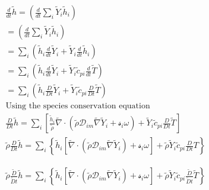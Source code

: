 \documentclass[preprint,12pt,authoryear]{elsarticle}
\begin{document}
\begin{equation}
\begin{split}
        \frac{d}{dt}\tilde{h}
        =
        \left(
                \frac{d}{dt}
		\sum\limits_i\tilde{Y}_i\tilde{h}_i
        \right)
\\
        =
        \left(
                \frac{d}{dt}
		\sum\limits_i\tilde{Y}_i
		\tilde{h}_i
        \right)
\\
        =
        \sum\limits_i
        \left(
                \tilde{h}_i
                \frac{d}{dt}
		\tilde{Y}_i
                +
                \tilde{Y}_i
                \frac{d}{dt}
		\tilde{h}_i
        \right)
\\
        =
        \sum\limits_i
        \left(
                \tilde{h}_i
                \frac{d}{dt}
		\tilde{Y}_i
                +
                \tilde{Y}_i
                \tilde{c}_{pi}
                \frac{d}{dt}
		\tilde{T}
        \right)
\\
        =
        \sum\limits_i
        \left(
                \tilde{h}_i
                \frac{D}{Dt}
		\tilde{Y}_i
                +
                \tilde{Y}_i
                \tilde{c}_{pi}
                \frac{D}{Dt}
		\tilde{T}
        \right)
\\
\text{Using the species conservation equation}
\\
        \frac{D}{Dt}
	\tilde{h}
        =
        \sum\limits_i
        \left[
                \frac{\tilde{h}_i}{\tilde{\rho}}
                \tilde{\nabla}\cdot
                (
		\tilde{\rho}\mathcal{D}_{im}\tilde{\nabla}\tilde{Y}_i
		+
        	\mathcal{s}_i \omega
		)
                +
                \tilde{Y}_i
                \tilde{c}_{pi}
        	\frac{D}{Dt}
		\tilde{T}
        \right]
\\
        \tilde{\rho}
        \frac{D}{Dt}
	\tilde{h}
        =
        \sum\limits_i
        \left\{
                \tilde{h}_i
                [
                	\tilde{\nabla}\cdot
			   (
			\tilde{\rho}\mathcal{D}_{im}\tilde{\nabla}\tilde{Y}_i
			)
			+
        		\mathcal{s}_i \omega
		    ]
                +
                \tilde{\rho}
                \tilde{Y}_i
                \tilde{c}_{pi}
        	\frac{D}{Dt}T
        \right\}
\end{split}
\end{equation}

\begin{equation}
\begin{split}
        \tilde{\rho}
        \frac{\tilde{D}}{\tilde{D} t}\tilde{h}
        =
        \sum\limits_i
        \left\{
                \tilde{h}_i
                [
                	\tilde{\nabla}\cdot
		     	(
			\tilde{\rho}\mathcal{D}_{im}\tilde{\nabla}\tilde{Y}_i
			)
			+
        		\mathcal{s}_i \omega
	        	]
                +
                \tilde{\rho}
                \tilde{Y}_i
                \tilde{c}_{pi}
                \frac{\tilde{D}}{\tilde{D} t}
                \tilde{T}
        \right\}
\end{split}
\end{equation}
\end{document}

